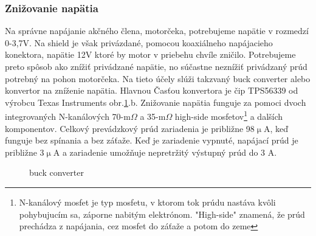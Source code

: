 \subsubsection{Znižovanie napätia}
\label{nap}

Na správne napájanie akčného člena, motorčeka, potrebujeme napätie v rozmedzí 0-3,7V. Na shield je však privázdané, pomocou koaxiálneho napájacieho konektora, napätie 12V ktoré by motor v priebehu chvíle zničilo. Potrebujeme preto spôsob ako znížiť privádzané napätie, no súčastne neznížiť privádzaný prúd potrebný na pohon motorčeka. Na tieto účely slúži takzvaný buck converter alebo konvertor na zníženie napätia. Hlavnou Časťou konvertora je čip TPS56339 od výrobcu Texas Instruments obr.\ref{OBRAZOK 2.1}.b. Znižovanie napätia funguje za pomoci dvoch integrovaných N-kanálových 70-m$\Omega$ a 35-m$\Omega$ high-side mosfetov\footnote[4]{N-kanálový mosfet je typ mosfetu, v ktorom tok prúdu nastáva kvôli pohybujucím sa, záporne nabitým elektrónom. "High-side" znamená, že prúd prechádza z napájania, cez mosfet do záťaže a potom do zeme} a dalších komponentov. Celkový prevádzkový prúd zariadenia je približne 98$\upmu$A, keď funguje bez spínania a bez záťaže. Keď je zariadenie vypnuté, napájací prúd je približne 3$\upmu$A a zariadenie umožňuje nepretržitý výstupný prúd do 3 A\cite{buckobr}.

\begin{figure}[!tbh]
\hfill
{}
\hfill
{}
\hfill
\caption{buck converter}\label{OBRAZOK 2.1}
\end{figure}

